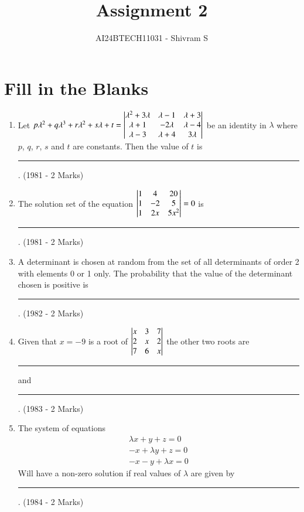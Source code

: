 \documentclass[journal]{IEEEtran}
\begin{document}

\onecolumn

\title{Assignment 2}
\author{AI24BTECH11031 - Shivram S}
\maketitle
\bigskip

\renewcommand{\thefigure}{\theenumi}
\renewcommand{\thetable}{\theenumi}

\section{Fill in the Blanks}
\begin{enumerate}
	\item Let $p\lambda^2 + q\lambda^3 + r\lambda^2 + s\lambda + t =
		\begin{vmatrix}
			\lambda^2 + 3\lambda & \lambda - 1 & \lambda + 3 \\
			\lambda + 1 & -2\lambda & \lambda - 4 \\
			\lambda - 3 & \lambda+ 4 & 3\lambda
		\end{vmatrix}$ be an identity in $\lambda$ where $p$, $q$, $r$, $s$ and $t$ are constants.
		Then the value of $t$ is \rule{1cm}{0.2pt}.
		\hfill (1981 - 2 Marks)
	
	\item The solution set of the equation $\begin{vmatrix}
			1 & 4 & 20 \\
			1 & -2 & 5 \\
			1 & 2x & 5x^2
		\end{vmatrix} = 0$ is \rule{1cm}{0.2pt}.
		\hfill (1981 - 2 Marks)

	\item A determinant is chosen at random from the set of all determinants of order
		2 with elements 0 or 1 only. The probability that the value of the determinant
		chosen is positive is \rule{1cm}{0.2pt}.
		\hfill (1982 - 2 Marks)

	\item Given that $x = -9$ is a root of $\begin{vmatrix}
			x & 3 & 7 \\
			2 & x & 2 \\
			7 & 6 & x
		\end{vmatrix}$ the other two roots are \rule{1cm}{0.2pt} and \rule{1cm}{0.15mm}.
		\hfill (1983 - 2 Marks)

	\item The system of equations
		\begin{gather*}
			\lambda x + y + z = 0 \\
			-x + \lambda y + z = 0 \\
			-x - y + \lambda x = 0
		\end{gather*}
		Will have a non-zero solution if real values of $\lambda$ are given by
		\rule{1cm}{0.2pt}.
		\hfill (1984 - 2 Marks)


\end{enumerate}
\end{document}
